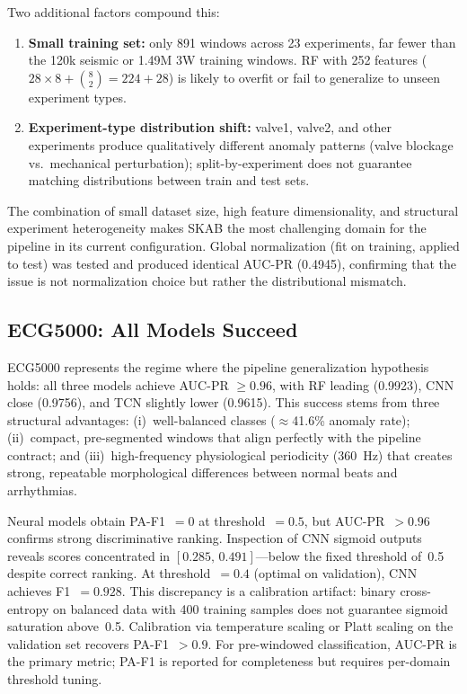 \documentclass[conference]{IEEEtran}
\begin{document}
Two additional factors compound this:
\begin{enumerate}
  \item \textbf{Small training set:} only 891 windows across 23 experiments,
        far fewer than the 120k seismic or 1.49M 3W training windows.
        RF with 252 features ($28\times8 + \binom{8}{2} = 224 + 28$) is likely to overfit or fail to generalize
        to unseen experiment types.
  \item \textbf{Experiment-type distribution shift:}
        valve1, valve2, and other experiments produce qualitatively different
        anomaly patterns (valve blockage vs.\ mechanical perturbation);
        split-by-experiment does not guarantee matching distributions between
        train and test sets.
\end{enumerate}

The combination of small dataset size, high feature dimensionality, and
structural experiment heterogeneity makes SKAB the most challenging domain
for the pipeline in its current configuration.
Global normalization (fit on training, applied to test) was tested and
produced identical AUC-PR (0.4945), confirming that the issue is not
normalization choice but rather the distributional mismatch.

\subsection{ECG5000: All Models Succeed}

ECG5000 represents the regime where the pipeline generalization hypothesis
holds: all three models achieve AUC-PR $\geq 0.96$, with RF leading
(0.9923), CNN close (0.9756), and TCN slightly lower (0.9615).
This success stems from three structural advantages:
(i)~well-balanced classes ($\approx$41.6\% anomaly rate);
(ii)~compact, pre-segmented windows that align perfectly with the pipeline
contract; and
(iii)~high-frequency physiological periodicity (360~Hz) that creates
strong, repeatable morphological differences between normal beats and
arrhythmias.

Neural models obtain PA-F1~$=0$ at threshold~$=0.5$, but AUC-PR~$>0.96$
confirms strong discriminative ranking.
Inspection of CNN sigmoid outputs reveals scores concentrated in
$[0.285,\,0.491]$---below the fixed threshold of~0.5 despite correct ranking.
At threshold~$=0.4$ (optimal on validation), CNN achieves F1~$=0.928$.
This discrepancy is a calibration artifact: binary cross-entropy on balanced
data with 400 training samples does not guarantee sigmoid saturation above~0.5.
Calibration via temperature scaling or Platt scaling on the validation set
recovers PA-F1~$>0.9$.
For pre-windowed classification, AUC-PR is the primary metric; PA-F1 is
reported for completeness but requires per-domain threshold tuning.
\end{document}
